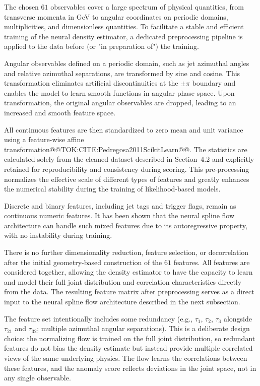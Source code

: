 \documentclass[11pt]{article}
\begin{document}
The chosen $61$ observables cover a large spectrum of physical quantities, from transverse momenta in GeV to angular coordinates on periodic domains, multiplicities, and dimensionless quantities. To facilitate a stable and efficient training of the neural density estimator, a dedicated preprocessing pipeline is applied to the data before (or "in preparation of") the training.

Angular observables defined on a periodic domain, such as jet azimuthal angles and relative azimuthal separations, are transformed by sine and cosine. This transformation eliminates artificial discontinuities at the $\pm\pi$ boundary and enables the model to learn smooth functions in angular phase space. Upon transformation, the original angular observables are dropped, leading to an increased and smooth feature space.

All continuous features are then standardized to zero mean and unit variance using a feature-wise affine transformation@@TOK:CITE:Pedregosa2011ScikitLearn@@. The statistics are calculated solely from the cleaned dataset described in Section~4.2 and explicitly retained for reproducibility and consistency during scoring. This pre-processing normalizes the effective scale of different types of features and greatly enhances the numerical stability during the training of likelihood-based models.

Discrete and binary features, including jet tags and trigger flags, remain as continuous numeric features. It has been shown that the neural spline flow architecture can handle such mixed features due to its autoregressive property, with no instability during training.

There is no further dimensionality reduction, feature selection, or decorrelation after the initial geometry-based construction of the $61$ features. All features are considered together, allowing the density estimator to have the capacity to learn and model their full joint distribution and correlation characteristics directly from the data. The resulting feature matrix after preprocessing serves as a direct input to the neural spline flow architecture described in the next subsection.

The feature set intentionally includes some redundancy (e.g., $\tau_1$, $\tau_2$, $\tau_3$ alongside $\tau_{21}$ and $\tau_{32}$; multiple azimuthal angular separations). This is a deliberate design choice: the normalizing flow is trained on the full joint distribution, so redundant features do not bias the density estimate but instead provide multiple correlated views of the same underlying physics. The flow learns the correlations between these features, and the anomaly score reflects deviations in the joint space, not in any single observable.
\end{document}
